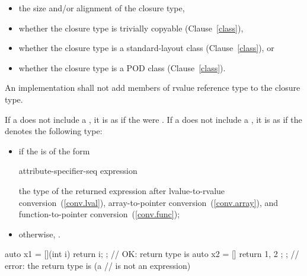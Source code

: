 \begin{itemize}
\item the size and/or alignment of the closure type,

\item whether the closure type is trivially copyable (Clause~\ref{class}),

\item whether the closure type is a standard-layout class (Clause~\ref{class}),
or

\item whether the closure type is a POD class (Clause~\ref{class}).
\end{itemize}

An implementation shall not add members of rvalue reference type to the closure
type.

\pnum
If a  does not include a
, it is as if the  were
\tcode{()}. If a  does not include a
, it is as if the 
denotes the following type:

\begin{itemize}
\item if the  is of the form

\begin{ncbnf}
\terminal{\{} attribute-specifier-seq\opt {} expression \terminal{;} \terminal{\}}
\end{ncbnf}

the type of the returned expression after lvalue-to-rvalue
conversion~(\ref{conv.lval}), array-to-pointer conversion~(\ref{conv.array}),
and function-to-pointer conversion~(\ref{conv.func});

\item otherwise, .
\end{itemize}

\enterexample
\begin{codeblock}
auto x1 = [](int i){ return i; }; // OK: return type is 
auto x2 = []{ return { 1, 2 }; }; // error: the return type is  (a
                                  //  is not an expression)
\end{codeblock}
\exitexample

